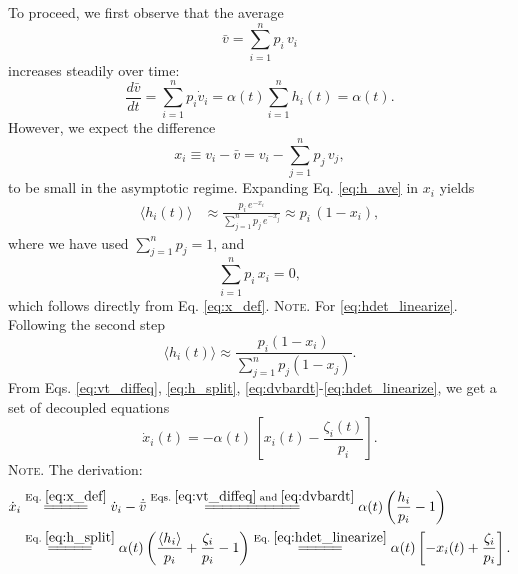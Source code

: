 \documentclass[reprint, floatfix]{revtex4-1}
\newcommand{\note}[1]{{\color{DarkGreen}\footnotesize \textsc{Note.} #1}}
\begin{document}
To proceed, we first observe that
the average
$$
\bar v = \sum_{i = 1}^n p_i \, v_i
$$
increases steadily over time:
%
\begin{equation}
\frac{ d \bar v } { d t }
=
\sum_{i = 1}^n p_i \dot v_i
=
\alpha(t) \sum_{i = 1}^n h_i(t) = \alpha(t).
\label{eq:dvbardt}
\end{equation}
%
However, we expect the difference %
%
\begin{equation}
  x_i \equiv v_i - \bar v = v_i - \sum_{j = 1}^n p_j \, v_j,
  \label{eq:x_def}
\end{equation}
%
to be small in the asymptotic regime.
Expanding Eq. \eqref{eq:h_ave} in $x_i$ yields
%
\begin{align}
  \langle h_i(t) \rangle
  &\approx
  \frac{                 p_i \, e^{- x_i} }
       { \sum_{ j = 1}^n p_j \, e^{- x_j} }
  \approx
  p_i \, (1 - x_i),
\label{eq:hdet_linearize}
\end{align}
%
where we have used $\sum_{j=1}^n p_j = 1$,
and
%
\begin{equation}
  \sum_{i = 1}^n p_i \, x_i = 0,
  \label{eq:px_sum}
\end{equation}
which follows directly from Eq. \eqref{eq:x_def}.
\note{For \eqref{eq:hdet_linearize}. Following the second step
$$
\langle h_i(t) \rangle
\approx
\frac{                 p_i (1 - x_i) }
     { \sum_{ j = 1}^n p_j (1 - x_j) }
.
$$
}%
From Eqs.
\eqref{eq:vt_diffeq},
\eqref{eq:h_split},
\eqref{eq:dvbardt}-\eqref{eq:hdet_linearize},
we get a set of decoupled equations
%
\begin{equation}
  \dot x_i(t)
  =
  -\alpha(t) \, \left[ x_i(t) - \frac{ \zeta_i(t) } { p_i } \right].
  \label{eq:dxdt_WL}
\end{equation}
\note{The derivation:
$$
\begin{aligned}
  \dot x_i
  &\stackrel{\mathrm{Eq.\; \eqref{eq:x_def}}}
            {=\joinrel=\joinrel=\joinrel=\joinrel=}
  \dot v_i - \dot{ \bar v }
  \stackrel{\mathrm{Eqs.\; \eqref{eq:vt_diffeq}\; and\; \eqref{eq:dvbardt}}}
            {=\joinrel=\joinrel=\joinrel=\joinrel=\joinrel=\joinrel=\joinrel=\joinrel=\joinrel=\joinrel=}
  \alpha(t) \left( \frac{ h_i } { p_i } - 1 \right)
  \\
  &\stackrel{\mathrm{Eq.\; \eqref{eq:h_split}}}
            {=\joinrel=\joinrel=\joinrel=\joinrel=}
  \alpha(t) \left( \frac{ \langle h_i \rangle } { p_i } + \frac{ \zeta_i } { p_i } - 1 \right)
  \stackrel{\mathrm{Eq.\; \eqref{eq:hdet_linearize}}}
            {=\joinrel=\joinrel=\joinrel=\joinrel=}
  \alpha(t) \left[ -x_i(t) + \frac{ \zeta_i } { p_i } \right].
\end{aligned}
$$
}
\end{document}
